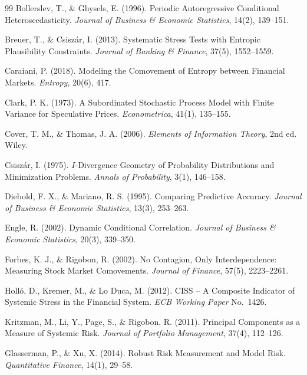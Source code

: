 \documentclass[11pt]{article}
\theoremstyle{definition}
\theoremstyle{remark}
\begin{document}
\begin{thebibliography}{99}
 Bollerslev, T., \& Ghysels, E. (1996). Periodic Autoregressive Conditional Heteroscedasticity. \textit{Journal of Business \& Economic Statistics}, 14(2), 139--151.

 Breuer, T., \& Csiszár, I. (2013). Systematic Stress Tests with Entropic Plausibility Constraints. \textit{Journal of Banking \& Finance}, 37(5), 1552--1559.

 Caraiani, P. (2018). Modeling the Comovement of Entropy between Financial Markets. \textit{Entropy}, 20(6), 417.

 Clark, P. K. (1973). A Subordinated Stochastic Process Model with Finite Variance for Speculative Prices. \textit{Econometrica}, 41(1), 135--155.

 Cover, T. M., \& Thomas, J. A. (2006). \textit{Elements of Information Theory}, 2nd ed. Wiley.

 Csiszár, I. (1975). $I$-Divergence Geometry of Probability Distributions and Minimization Problems. \textit{Annals of Probability}, 3(1), 146--158.

 Diebold, F. X., \& Mariano, R. S. (1995). Comparing Predictive Accuracy. \textit{Journal of Business \& Economic Statistics}, 13(3), 253--263.

 Engle, R. (2002). Dynamic Conditional Correlation. \textit{Journal of Business \& Economic Statistics}, 20(3), 339--350.

 Forbes, K. J., \& Rigobon, R. (2002). No Contagion, Only Interdependence: Measuring Stock Market Comovements. \textit{Journal of Finance}, 57(5), 2223--2261.

 Holló, D., Kremer, M., \& Lo Duca, M. (2012). CISS -- A Composite Indicator of Systemic Stress in the Financial System. \textit{ECB Working Paper} No.~1426.

 Kritzman, M., Li, Y., Page, S., \& Rigobon, R. (2011). Principal Components as a Measure of Systemic Risk. \textit{Journal of Portfolio Management}, 37(4), 112--126.

 Glasserman, P., \& Xu, X. (2014). Robust Risk Measurement and Model Risk. \textit{Quantitative Finance}, 14(1), 29--58.


\end{thebibliography}
\end{document}

